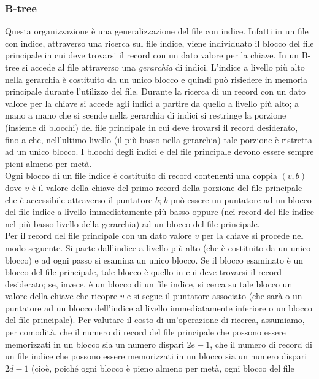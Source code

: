 \subsubsection{B-tree}
Questa organizzazione è una generalizzazione del file con indice. Infatti in un file con indice,
attraverso una ricerca sul file indice, viene individuato il blocco del file principale in cui deve
trovarsi il record con un dato valore per la chiave. In un B-tree si accede al file attraverso una
\emph{gerarchia} di indici. L'indice a livello più alto nella gerarchia è costituito da un unico blocco e quindi
può risiedere in memoria principale durante l'utilizzo del file. Durante la ricerca di un record con un
dato valore per la chiave si accede agli indici a partire da quello a livello più alto; a mano a mano
che si scende nella gerarchia di indici si restringe la porzione (insieme di blocchi) del file principale
in cui deve trovarsi il record desiderato, fino a che, nell'ultimo livello (il più basso nella gerarchia)
tale porzione è ristretta ad un unico blocco. I blocchi degli indici e del file principale devono essere
sempre pieni almeno per metà.\\
Ogni blocco di un file indice è costituito di record contenenti una coppia $(v, b)$ dove $v$ è il valore
della chiave del primo record della porzione del file principale che è accessibile attraverso il
puntatore $b$; $b$ può essere un puntatore ad un blocco del file indice a livello immediatamente più
basso oppure (nei record del file indice nel più basso livello della gerarchia) ad un blocco del file
principale.\\
Per  il record del file principale con un dato valore $v$ per la chiave si procede nel modo
seguente. Si parte dall'indice a livello più alto (che è costituito da un unico blocco) e ad ogni passo
si esamina un unico blocco. Se il blocco esaminato è un blocco del file principale, tale blocco è
quello in cui deve trovarsi il record desiderato; se, invece, è un blocco di un file indice, si cerca su
tale blocco un valore della chiave che ricopre $v$ e si segue il puntatore associato (che sarà o un
puntatore ad un blocco dell'indice al livello immediatamente inferiore o un blocco del file
principale). Per valutare il costo di un'operazione di ricerca, assumiamo, per comodità, che il
numero di record del file principale che possono essere memorizzati in un blocco sia un numero
dispari $2e-1$, che il numero di record di un file indice che possono essere memorizzati in un blocco
sia un numero dispari $2d-1$ (cioè, poiché ogni blocco è pieno almeno per metà, ogni blocco del file
